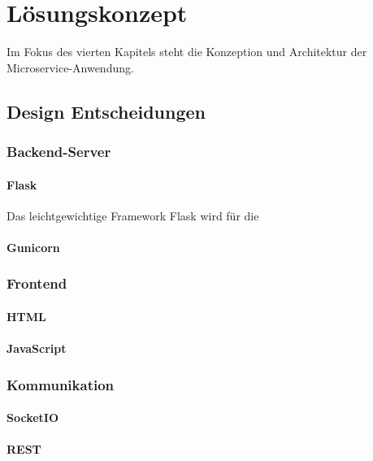 \chapter{Lösungskonzept}
Im Fokus des vierten Kapitels steht die Konzeption und Architektur der Microservice-Anwendung.

\section{Design Entscheidungen}

\subsection{Backend-Server}

\subsubsection{Flask}
Das leichtgewichtige Framework Flask wird für die 

\subsubsection{Gunicorn}

\subsection{Frontend}

\subsubsection{HTML}

\subsubsection{JavaScript}

\subsection{Kommunikation}

\subsubsection{SocketIO}

\subsubsection{REST}

